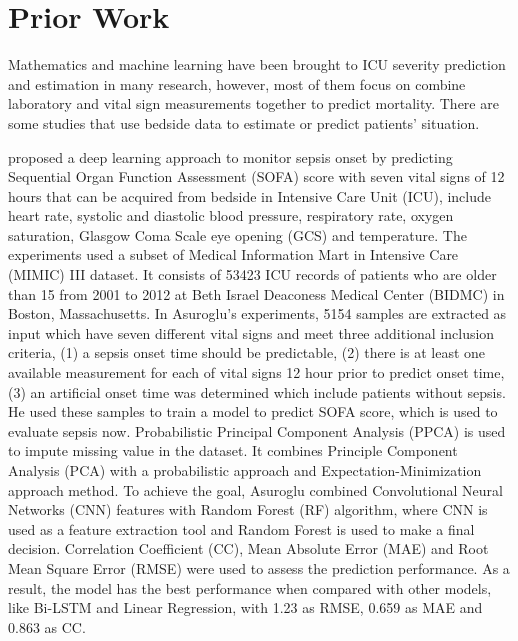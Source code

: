 \documentclass[12pt,a4paper,english
]{tunithesis}
\begin{document}
\chapter{Prior Work}
\label{ch:priorwork}
Mathematics and machine learning have been brought to ICU severity prediction and estimation in many research, however, most of them focus on combine laboratory and vital sign measurements together to predict mortality. There are some studies that use bedside data to estimate or predict patients' situation.

\textcite{asuroglu2021} proposed a deep learning approach to monitor sepsis onset by predicting Sequential Organ Function Assessment (SOFA) score with seven vital signs of 12 hours that can be acquired from bedside in Intensive Care Unit (ICU), include heart rate, systolic and diastolic blood pressure, respiratory rate, oxygen saturation, Glasgow Coma Scale eye opening (GCS) and temperature. The experiments used a subset of Medical Information Mart in Intensive Care (MIMIC) III dataset. It consists of 53423 ICU records of patients who are older than 15 from 2001 to 2012 at Beth Israel Deaconess Medical Center (BIDMC) in Boston, Massachusetts. In Asuroglu's experiments, 5154 samples are extracted as input which have seven different vital signs and meet three additional inclusion criteria, (1) a sepsis onset time should be predictable, (2) there is at least one available measurement for each of vital signs 12 hour prior to predict onset time, (3) an artificial onset time was determined which include patients without sepsis. He used these samples to train a model to predict SOFA score, which is used to evaluate sepsis now. Probabilistic Principal Component Analysis (PPCA) is used to impute missing value in the dataset. It combines Principle Component Analysis (PCA) with a probabilistic approach and Expectation-Minimization approach method. To achieve the goal, Asuroglu combined Convolutional Neural Networks (CNN) features with Random Forest (RF) algorithm, where CNN is used as a feature extraction tool and Random Forest is used to make a final decision. Correlation Coefficient (CC), Mean Absolute Error (MAE) and Root Mean Square Error (RMSE) were used to assess the prediction performance. As a result, the model has the best performance when compared with other models, like Bi-LSTM and Linear Regression, with 1.23 as RMSE, 0.659 as MAE and 0.863 as CC.
\end{document}

